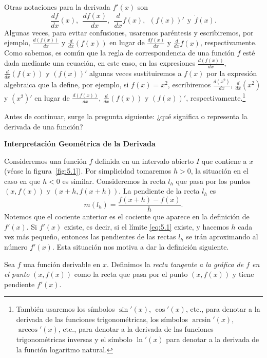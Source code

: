 \documentclass[12pt,a4paper]{book}
\newcommand{\subtitulo}[1]{\par\avoidorphan{5}\addvspace{\medskipamount}\noindent\textbf{#1}\par\nobreak}
\begin{document}
    Otras notaciones para la derivada $f'(x)$ son
    \begin{equation*}
        \frac{df}{dx}(x),\ \ \frac{df(x)}{dx},\ \ \frac{d}{dx}f(x),\ \ (f(x))'\ \ \text{y}\ \ \dot{f}(x).
    \end{equation*}
    Algunas veces, para evitar confusiones, usaremos paréntesis y escribiremos,
    por ejemplo, $\frac{d(f(x))}{dx}$ y $\frac{d}{dx}(f(x))$ en lugar de $\frac{df(x)}{dx}$ y $\frac{d}{dx}f(x)$, respectivamente.
    Como sabemos, es común que la regla de correspondencia de una función
    $f$ esté dada mediante una ecuación, en este caso, en las expresiones $\frac{d(f(x))}{dx}$,
    $\frac{d}{dx}(f(x))$ y $(f(x))'$ algunas veces sustituiremos a $f(x)$ por la expresión
    algebraica que la define, por ejemplo, si $f(x)=x^{2}$, escribiremos $\frac{d\left(x^{2}\right)}{dx}$, $\frac{d}{dx}\left(x^{2}\right)$
    y $\left(x^{2}\right)'$ en lugar de $\frac{d(f(x))}{dx}$, $\frac{d}{dx}(f(x))$ y $(f(x))'$, respectivamente.\footnote{También usaremos los símbolos $\sin'(x)$, $\cos'(x)$, etc., para denotar a la derivada de
    las funciones trigonométricas, los símbolos $\arcsin'(x)$, $\arccos'(x)$, etc., para denotar a la
    derivada de las funciones trigonométricas inversas y el símbolo $\ln'(x)$ para denotar a la
    derivada de la función logaritmo natural.}

    Antes de continuar, surge la pregunta siguiente: ¿qué significa o representa
    la derivada de una función?

    \subtitulo{Interpretación Geométrica de la Derivada}

    Consideremos una función $f$ definida en un intervalo abierto $I$ que contiene
    a $x$ (véase la figura~\ref{fig:5.1}). Por simplicidad tomaremos $h>0$, la situación en
    el caso en que $h<0$ es similar. Consideremos la recta $l_{h}$ que pasa por los
    puntos $(x,f(x))$ y $(x+h,f(x+h))$. La pendiente de la recta $l_{h}$ es
    \begin{equation*}
        m(l_{h})=\frac{f(x+h)-f(x)}{h}.
    \end{equation*}
    Notemos que el cociente anterior es el cociente que aparece en la definición de
    $f'(x)$. Si $f'(x)$ existe, es decir, si el límite \eqref{eq:5.1} existe, y hacemos $h$ cada vez
    más pequeño, entonces las pendientes de las rectas $l_{h}$ se irán aproximando al
    número $f'(x)$. Esta situación nos motiva a dar la definición siguiente.

    \begin{definicion}\label{def:45}
        Sea $f$
        una función derivable en $x$. Definimos la \textit{recta tangente a la gráfica de $f$
        en el punto} $(x,f(x))$ como la recta que pasa por el punto $(x,f(x))$ y tiene
        pendiente $f'(x)$.
    \end{definicion}
\end{document}

